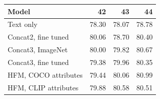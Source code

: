 \begin{tabular}{lrrr}
\toprule
Model & 42 & 43 & 44 \\
\midrule
Text only & 78.30 & 78.07 & 78.78 \\
Concat2, fine tuned & 80.06 & 78.70 & 80.40 \\
Concat3, ImageNet & 80.00 & 79.82 & 80.67 \\
Concat3, fine tuned & 79.38 & 79.96 & 80.35 \\
HFM, COCO attributes & 79.44 & 80.06 & 80.99 \\
HFM, CLIP attributes & 79.88 & 80.58 & 80.51 \\
\bottomrule
\end{tabular}
